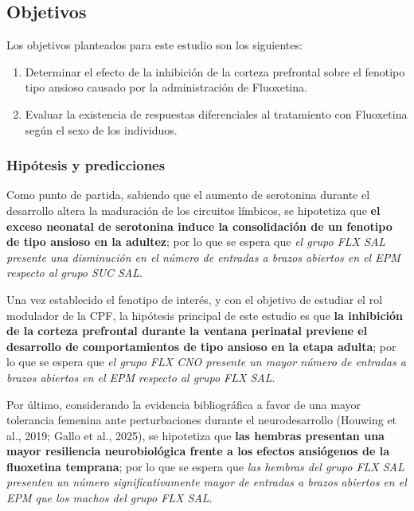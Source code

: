 \documentclass[
  letterpaper,
  DIV=11,
  numbers=noendperiod]{scrartcl}
\providecommand{\tightlist}{%
  \setlength{\itemsep}{0pt}\setlength{\parskip}{0pt}}
\begin{document}
\subsection{\texorpdfstring{\textbf{Objetivos}}{Objetivos}}\label{objetivos}

Los objetivos planteados para este estudio son los siguientes:

\begin{enumerate}
\def\labelenumi{\arabic{enumi}.}
\tightlist
\item
  Determinar el efecto de la inhibición de la corteza prefrontal sobre
  el fenotipo tipo ansioso causado por la administración de Fluoxetina.
\item
  Evaluar la existencia de respuestas diferenciales al tratamiento con
  Fluoxetina según el sexo de los individuos.
\end{enumerate}

\subsubsection{\texorpdfstring{\textbf{Hipótesis y
predicciones}}{Hipótesis y predicciones}}\label{hipuxf3tesis-y-predicciones}

Como punto de partida, sabiendo que el aumento de serotonina durante el
desarrollo altera la maduración de los circuitos límbicos, se hipotetiza
que \textbf{el exceso neonatal de serotonina induce la consolidación de
un fenotipo de tipo ansioso en la adultez}; por lo que se espera que
\emph{el grupo FLX SAL presente una disminución en el número de entradas
a brazos abiertos en el EPM respecto al grupo SUC SAL}.

Una vez establecido el fenotipo de interés, y con el objetivo de
estudiar el rol modulador de la CPF, la hipótesis principal de este
estudio es que \textbf{la inhibición de la corteza prefrontal durante la
ventana perinatal previene el desarrollo de comportamientos de tipo
ansioso en la etapa adulta}; por lo que se espera que \emph{el grupo FLX
CNO presente un mayor número de entradas a brazos abiertos en el EPM
respecto al grupo FLX SAL}.

Por último, considerando la evidencia bibliográfica a favor de una mayor
tolerancia femenina ante perturbaciones durante el neurodesarrollo
(Houwing et al., 2019; Gallo et al., 2025), se hipotetiza que
\textbf{las hembras presentan una mayor resiliencia neurobiológica
frente a los efectos ansiógenos de la fluoxetina temprana}; por lo que
se espera que \emph{las hembras del grupo FLX SAL presenten un número
significativamente mayor de entradas a brazos abiertos en el EPM que los
machos del grupo FLX SAL}.
\end{document}
